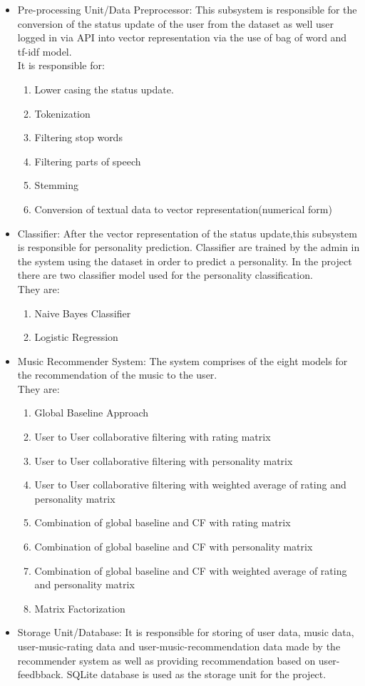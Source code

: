 \begin{itemize}
	\item Pre-processing Unit/Data Preprocessor: This subsystem is responsible for the conversion of the status update of the user from the dataset \cite{dataset} as well user logged in via API \cite{api} into vector representation via the use of bag of word and tf-idf model.\\
It is responsible for:
		\begin{enumerate}
			\item Lower casing the status update.
			\item Tokenization
			\item Filtering stop words
			\item Filtering parts of speech
			\item Stemming
			\item Conversion of textual data to vector representation(numerical form)
		\end{enumerate}
	\item Classifier: After the vector representation of the status update,this subsystem is responsible for personality prediction. Classifier are trained by the admin in the system using the dataset \cite{dataset} in order to predict a personality. In the project there are two classifier model used for the personality classification.\\
They are:
\begin{enumerate}
	\item Naive Bayes Classifier
	\item Logistic Regression
\end{enumerate}
\item Music Recommender System: The system comprises of the eight models for the recommendation of the music to the user.\\
They are:
\begin{enumerate}
	\item Global Baseline Approach
	\item User to User collaborative filtering with rating matrix
	\item User to User collaborative filtering with personality matrix
	\item User to User collaborative filtering with weighted average of rating and personality matrix
	\item Combination of global baseline and CF with rating matrix
	\item Combination of global baseline and CF with personality matrix
	\item Combination of global baseline and CF with weighted average of rating and personality matrix
	\item Matrix Factorization
\end{enumerate}
\item Storage Unit/Database: It is responsible for storing of user data, music data, user-music-rating data and user-music-recommendation data made by the recommender system as well as providing recommendation based on user-feedbback. SQLite database is used as the storage unit for the project.
\end{itemize}


